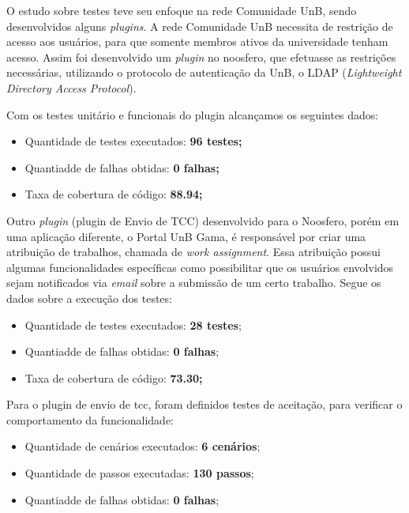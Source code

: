 
O estudo sobre testes teve seu enfoque na rede Comunidade UnB, sendo desenvolvidos alguns \textit{plugins}. A rede Comunidade UnB 
necessita de restrição de acesso aos usuários, para que somente membros ativos da universidade tenham acesso. 
%
Assim foi desenvolvido um \textit{plugin} no noosfero, que efetuasse as restrições necessárias, utilizando o protocolo de autenticação da UnB, o LDAP (\textit{Lightweight Directory Access Protocol}).

Com os testes unitário e funcionais do plugin alcançamos os seguintes dados:

\begin{itemize}
\item Quantidade de testes executados: \textbf{96 testes;}
\item Quantiadde de falhas obtidas: \textbf{0 falhas;}
\item Taxa de cobertura de código: \textbf{88.94;}
\end{itemize}

Outro \textit{plugin} (plugin de Envio de TCC) desenvolvido para o Noosfero, porém em uma aplicação diferente, o Portal UnB Gama, é responsável por criar uma atribuição de trabalhos, chamada de \textit{work assignment}. Essa atribuição possui algumas funcionalidades específicas como possibilitar que os usuários envolvidos sejam notificados via \textit{email} sobre a submissão de um certo trabalho. Segue os dados sobre a execução dos testes:

\begin{itemize}
\item Quantidade de testes executados: \textbf{28 testes};
\item Quantiadde de falhas obtidas: \textbf{0 falhas};
\item Taxa de cobertura de código: \textbf{73.30;}
\end{itemize}

Para o plugin de envio de tcc, foram definidos testes de aceitação, para verificar o comportamento da funcionalidade:

\begin{itemize}
\item Quantidade de cenários executados: \textbf{6 cenários};
\item Quantidade de passos executadas: \textbf{130 passos};
\item Quantiadde de falhas obtidas: \textbf{0 falhas};
\end{itemize}

